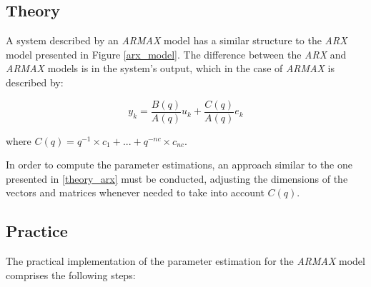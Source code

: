 \documentclass[12pt]{article}
\begin{document}
\subsection{Theory}
\label{theory_armax}

A system described by an \emph{ARMAX} model has a similar structure to the \emph{ARX} model presented in Figure \ref{arx_model}. The difference between the \emph{ARX} and \emph{ARMAX} models is in the system's output, which in the case of \emph{ARMAX} is described by:

$$y_{k} = \frac{B(q)}{A(q)} u_{k} + \frac{C(q)}{A(q)} e_{k} $$

where $C(q) = q^{-1} \times c_{1} + ... + q^{-nc} \times c_{nc}$.

In order to compute the parameter estimations, an approach similar to the one presented in \ref{theory_arx} must be conducted, adjusting the dimensions of the vectors and matrices whenever needed to take into account $C(q)$.

\subsection{Practice}
\label{parameter_estimation_armax}

The practical implementation of the parameter estimation for the \emph{ARMAX} model comprises the following steps:
\end{document}
